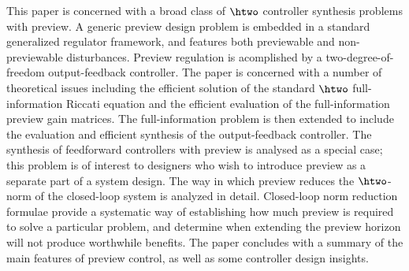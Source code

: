 \label{sec:Abstract}
This paper is concerned with a broad class of $\htwo$ controller synthesis problems with preview. A generic preview design problem is 
embedded in a standard generalized regulator framework, and features both previewable and non-previewable disturbances. Preview regulation is acomplished by a two-degree-of-freedom output-feedback controller. The paper is concerned with a number of theoretical issues including the efficient solution of the standard $\htwo$ full-information Riccati equation and the efficient evaluation of the full-information preview gain matrices. The full-information problem is then extended to include the evaluation and efficient synthesis of the output-feedback controller.
 The synthesis of feedforward controllers with preview is analysed as a special case; this problem is of interest to designers who wish to introduce preview as a separate part of a system design. The way in which preview reduces the $\htwo$-norm of the closed-loop system is analyzed in detail.
Closed-loop norm reduction formulae provide a systematic way of establishing how much preview is required to solve a particular problem, and determine when extending the preview horizon will not produce worthwhile benefits. The paper concludes with a summary of the main features of preview control, as well as some controller design insights. 